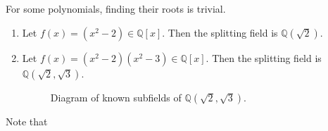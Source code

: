   \begin{example}
    For some polynomials, finding their roots is trivial. 
    \begin{enumerate}
      \item Let $f(x) = (x^2 - 2) \in \mathbb{Q}[x]$. Then the splitting field is $\mathbb{Q}(\sqrt{2})$. 

      \item Let $f(x) = (x^2 - 2)(x^2 - 3) \in \mathbb{Q}[x]$. Then the splitting field is $\mathbb{Q}(\sqrt{2}, \sqrt{3})$. 
        
      \begin{figure}[H]
        \centering 
        \caption{Diagram of known subfields of $\mathbb{Q}(\sqrt{2}, \sqrt{3})$.} 
      \end{figure}
    \end{enumerate}
    Note that 
  \end{example}

